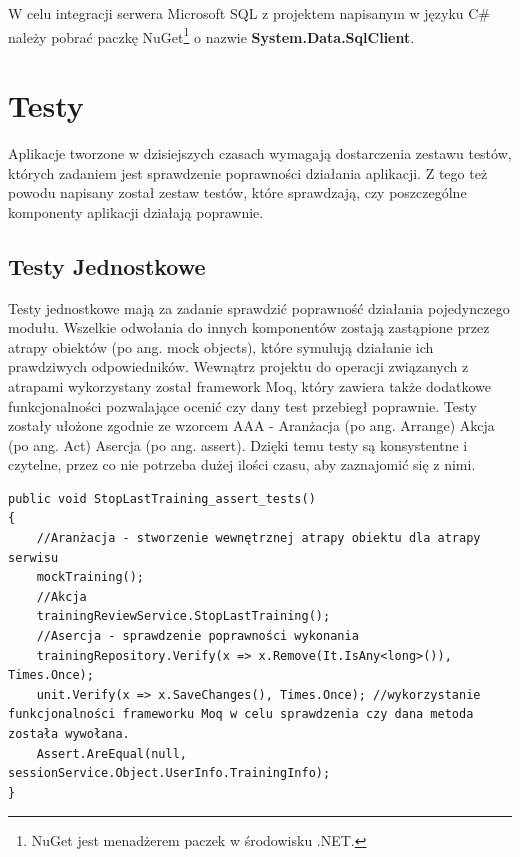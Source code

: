 W celu integracji serwera Microsoft SQL z projektem napisanym w języku C\# należy pobrać paczkę NuGet\footnote{NuGet jest menadżerem paczek w środowisku .NET.\cite{Nuget}} o nazwie \textbf{System.Data.SqlClient}.




\newpage
{\let\cleardoublepage\relax \chapter{Testy}}


Aplikacje tworzone w dzisiejszych czasach wymagają dostarczenia zestawu testów, których zadaniem jest sprawdzenie poprawności działania aplikacji. Z tego też powodu napisany został zestaw testów, które sprawdzają, czy poszczególne komponenty aplikacji działają poprawnie.

\section{Testy Jednostkowe}

Testy jednostkowe mają za zadanie sprawdzić poprawność działania pojedynczego modułu. Wszelkie odwołania do innych komponentów zostają zastąpione przez atrapy obiektów (po ang. mock objects), które symulują działanie ich prawdziwych odpowiedników.
 Wewnątrz projektu do operacji związanych z atrapami wykorzystany został framework Moq, który zawiera także dodatkowe funkcjonalności pozwalające ocenić czy dany test przebiegł poprawnie.
Testy zostały ułożone zgodnie ze wzorcem AAA\cite{UnitTestingMicrosoft} - Aranżacja (po ang. Arrange) Akcja (po ang. Act) Asercja (po ang. assert).  Dzięki temu testy są konsystentne i czytelne, przez co nie potrzeba dużej ilości czasu, aby zaznajomić się z nimi.

\begin{lstlisting}[frame=single, numbers=none,captionpos=b, 
caption={Przykładowy test jednostkowy wykorzystujący wzorzec AAA}]
public void StopLastTraining_assert_tests()
{
	//Aranżacja - stworzenie wewnętrznej atrapy obiektu dla atrapy serwisu
	mockTraining();
	//Akcja
	trainingReviewService.StopLastTraining();
	//Asercja - sprawdzenie poprawności wykonania
	trainingRepository.Verify(x => x.Remove(It.IsAny<long>()), Times.Once);
	unit.Verify(x => x.SaveChanges(), Times.Once); //wykorzystanie funkcjonalności frameworku Moq w celu sprawdzenia czy dana metoda została wywołana.
	Assert.AreEqual(null, sessionService.Object.UserInfo.TrainingInfo);
}
\end{lstlisting}

